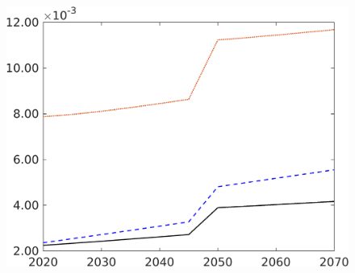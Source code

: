 \begin{figure}[h!!]
\begin{minipage}[]{0.32\textwidth}
	\end{minipage}
	\begin{minipage}[]{0.32\textwidth}
		\includegraphics[width=1\textwidth]{../../codding_model/own_basedOnFried/optimalPol_190722_tidiedUp/figures/all_10Aout22/CompMod1_OPT_T_NoTaus_Lg_regime3_spillover0_noskill0_sep1_xgrowth0_extern0_PV1_etaa0.79_lgd0.png}
	\end{minipage}
\end{figure}

 
 
